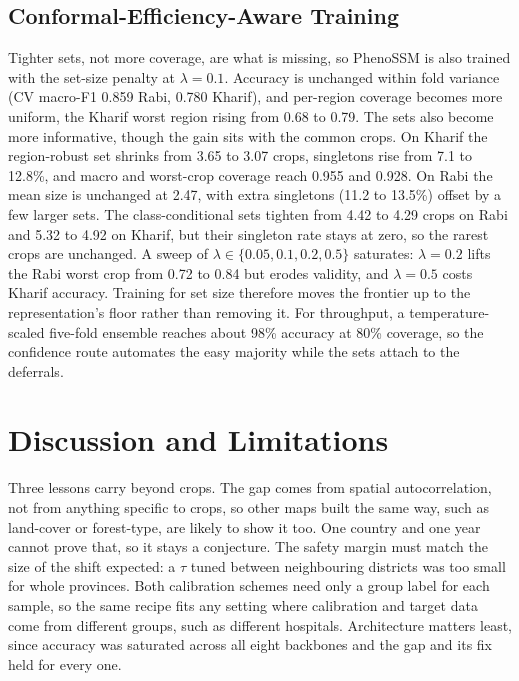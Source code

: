 \documentclass[conference]{IEEEtran}
\begin{document}
\subsection{Conformal-Efficiency-Aware Training}\label{ssec:conftr}
Tighter sets, not more coverage, are what is missing, so PhenoSSM is also trained with
the set-size penalty at $\lambda{=}0.1$. Accuracy is unchanged within fold variance
(CV macro-F1 0.859 Rabi, 0.780 Kharif), and per-region coverage becomes more uniform,
the Kharif worst region rising from 0.68 to 0.79. The sets also become more
informative, though the gain sits with the common crops. On Kharif the region-robust
set shrinks from 3.65 to 3.07 crops, singletons rise from 7.1 to 12.8\%, and macro and
worst-crop coverage reach 0.955 and 0.928. On Rabi the mean size is unchanged at 2.47,
with extra singletons (11.2 to 13.5\%) offset by a few larger sets. The
class-conditional sets tighten from 4.42 to 4.29 crops on Rabi and 5.32 to 4.92 on
Kharif, but their singleton rate stays at zero, so the rarest crops are unchanged. A
sweep of $\lambda\in\{0.05,0.1,0.2,0.5\}$ saturates: $\lambda{=}0.2$ lifts the Rabi
worst crop from 0.72 to 0.84 but erodes validity, and $\lambda{=}0.5$ costs Kharif
accuracy. Training for set size therefore moves the frontier up to the
representation's floor rather than removing it. For throughput, a temperature-scaled
five-fold ensemble reaches about 98\% accuracy at 80\% coverage, so the confidence
route automates the easy majority while the sets attach to the deferrals.

\section{Discussion and Limitations}
Three lessons carry beyond crops. The gap comes from spatial autocorrelation, not from
anything specific to crops, so other maps built the same way, such as land-cover or
forest-type, are likely to show it too. One country and one year cannot prove that, so
it stays a conjecture. The safety margin must match the size of the shift expected: a
$\tau$ tuned between neighbouring districts was too small for whole provinces. Both
calibration schemes need only a group label for each sample, so the same recipe fits
any setting where calibration and target data come from different groups, such as
different hospitals. Architecture matters least, since accuracy was saturated across
all eight backbones and the gap and its fix held for every one.
\end{document}
